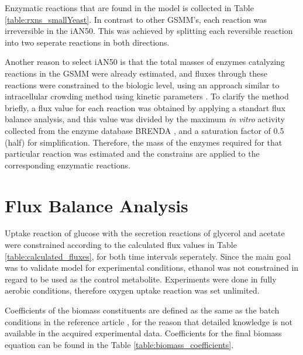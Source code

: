 Enzymatic reactions that are found in the model is collected in Table \ref{table:rxns_smallYeast}. In contrast to other GSMM's, each reaction was irreversible in the iAN50. This was achieved by splitting each reversible reaction into two seperate reactions in both directions.

Another reason to select iAN50 is that the total masses of enzymes catalyzing reactions in the GSMM were already estimated, and fluxes through these reactions were constrained to the biologic level, using an approach similar to intracellular crowding method using kinetic parameters \cite{beg2007intracellular, adadi2012prediction}. To clarify the method briefly, a flux value for each reaction was obtained by applying a standart flux balance analysis, and this value was divided by the maximum \emph{in vitro} activity collected from the enzyme database BRENDA \cite{schomburg2012brenda}, and a saturation factor of 0.5 (half) for simplification. Therefore, the mass of the enzymes required for that particular reaction was estimated and the constrains are applied to the corresponding enzymatic reactions.



\section{Flux Balance Analysis}
Uptake reaction of glucose with the secretion reactions of glycerol and acetate were constrained according to the calculated flux values in Table \ref{table:calculated_fluxes}, for both time intervals seperately. Since the main goal was to validate model for experimental conditions, ethanol was not constrained in regard to be used as the control metabolite. Experiments were done in fully aerobic conditions, therefore oxygen uptake reaction was set unlimited.

Coefficients of the biomass constituents are defined as the same as the batch conditions in the reference article \cite{nilsson2016metabolic}, for the reason that detailed knowledge is not available in the acquired experimental data. Coefficients for the final biomass equation can be found in the Table \ref{table:biomass_coefficients}.


